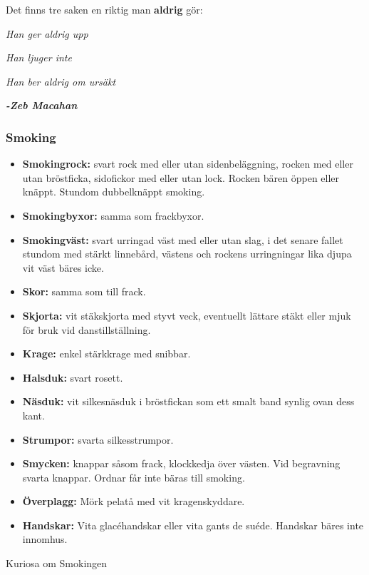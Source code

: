     Det finns tre saken en riktig man \textbf{aldrig} gör:

    \textit{Han ger aldrig upp}
    
    \textit{Han ljuger inte}
    
    \textit{Han ber aldrig om ursäkt}
    
    \textit{\textbf{-Zeb Macahan}} 

    \subsubsection{\textbf{Smoking}}

    \begin{itemize}
        
        \item[]\textbf{Smokingrock:} svart rock med eller utan sidenbeläggning, rocken med eller utan bröstficka, sidofickor med eller utan lock. Rocken bären öppen eller knäppt. Stundom dubbelknäppt smoking.
        
        \item[]\textbf{Smokingbyxor:} samma som frackbyxor.
        
        \item[]\textbf{Smokingväst:} svart urringad väst med eller utan slag, i det senare fallet stundom med stärkt linnebård, västens och rockens urringningar lika djupa vit väst bäres icke.
        
        \item[]\textbf{Skor:} samma som till frack.
        
        \item[]\textbf{Skjorta:} vit stäkskjorta med styvt veck, eventuellt lättare stäkt eller mjuk för bruk vid danstillställning.
        
        \item[]\textbf{Krage:} enkel stärkkrage med snibbar.
        
        \item[]\textbf{Halsduk:} svart rosett.
        
        \item[]\textbf{Näsduk:} vit silkesnäsduk i bröstfickan som ett smalt band synlig ovan dess kant.
        
        \item[]\textbf{Strumpor:} svarta silkesstrumpor.
        
        \item[]\textbf{Smycken:} knappar såsom frack, klockkedja över västen. Vid begravning svarta knappar. Ordnar får inte bäras till smoking.
        
        \item[]\textbf{Överplagg:} Mörk pelatå med vit kragenskyddare.
        
        \item[]\textbf{Handskar:} Vita glacéhandskar eller vita gants de suéde. Handskar bäres inte innomhus.
        
    \end{itemize}
    Kuriosa om Smokingen

